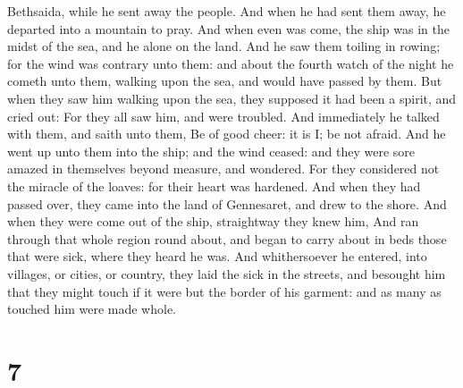 Bethsaida, while he sent away the people.  And when he
had sent them away, he departed into a mountain to pray. 
And when even was come, the ship was in the midst of the sea, and he
alone on the land.  And he saw them toiling in rowing;
for the wind was contrary unto them: and about the fourth watch of the
night he cometh unto them, walking upon the sea, and would have passed
by them.  But when they saw him walking upon the sea,
they supposed it had been a spirit, and cried out:  For
they all saw him, and were troubled. And immediately he talked with
them, and saith unto them, Be of good cheer: it is I; be not afraid.
 And he went up unto them into the ship; and the wind
ceased: and they were sore amazed in themselves beyond measure, and
wondered.  For they considered not the miracle of the
loaves: for their heart was hardened.  And when they had
passed over, they came into the land of Gennesaret, and drew to the
shore.  And when they were come out of the ship,
straightway they knew him,  And ran through that whole
region round about, and began to carry about in beds those that were
sick, where they heard he was.  And whithersoever he
entered, into villages, or cities, or country, they laid the sick in the
streets, and besought him that they might touch if it were but the
border of his garment: and as many as touched him were made whole.

\hypertarget{section-6}{%
\section{7}\label{section-6}}

